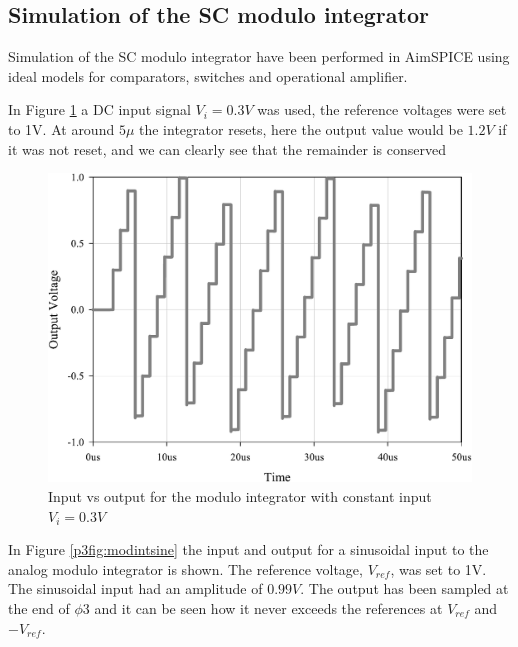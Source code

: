 \subsection{Simulation of the SC modulo integrator}
Simulation of the SC modulo integrator have been performed in
AimSPICE \cite{aimspice} using ideal models for comparators, switches
and operational amplifier. 

In Figure \ref{p3fig:modintdc} a DC input
signal $V_i = 0.3V$ was used, the reference voltages were set to 1V. At around $5 \mu$ the integrator
resets, here the output value would be $1.2V$ if it was not reset, and
we can clearly see that the remainder is conserved 

\begin{figure}[ht]
\centering 
 \includegraphics[width=\myfigwidth]{graphics/modintdc}
  \caption{Input vs output for the modulo integrator with constant input $V_i = 0.3V $}
  \label{p3fig:modintdc}
\end{figure}

In Figure \ref{p3fig:modintsine} the input and output for a sinusoidal
input to  the analog   modulo integrator is shown. The reference
voltage, $V_{ref}$, was set to 1V.
The sinusoidal input had an amplitude of $0.99 V$. The output has
been sampled at the end of $\phi 3$ and it can be seen how it never
exceeds the references at $V_{ref}$ and $-V_{ref}$.





